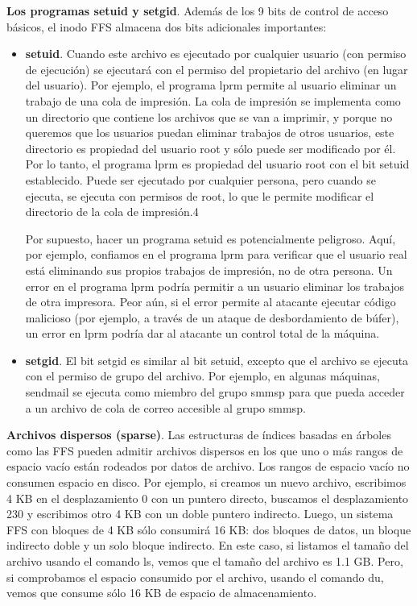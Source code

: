 \documentclass[10pt]{book}
\begin{document}
\textbf{Los programas setuid y setgid}. Además de los 9 bits de control de acceso básicos, el inodo FFS almacena dos bits adicionales importantes:
\begin{itemize}
\item \textbf{setuid}. Cuando este archivo es ejecutado por cualquier usuario (con permiso de ejecución) se ejecutará con el permiso del propietario del archivo (en lugar del usuario). Por ejemplo, el programa {\mf lprm} permite al usuario eliminar un trabajo de una cola de impresión. La cola de impresión se implementa como un directorio que contiene los archivos que se van a imprimir, y porque no queremos que los usuarios puedan eliminar trabajos de otros usuarios, este directorio es propiedad del usuario {\mf root} y sólo puede ser modificado por él. Por lo tanto, el programa {\mf lprm} es propiedad del usuario {\mf root} con el bit {\mf setuid} establecido. Puede ser ejecutado por cualquier persona, pero cuando se ejecuta, se ejecuta con permisos de {\mf root}, lo que le permite modificar el directorio de la cola de impresión.4

Por supuesto, hacer un programa {\mf setuid} es potencialmente peligroso. Aquí, por ejemplo, confiamos en el programa {\mf lprm} para verificar que el usuario real está eliminando sus propios trabajos de impresión, no de otra persona. Un error en el programa {\mf lprm} podría permitir a un usuario eliminar los trabajos de otra impresora. Peor aún, si el error permite al atacante ejecutar código malicioso (por ejemplo, a través de un ataque de desbordamiento de búfer), un error en {\mf lprm} podría dar al atacante un control total de la máquina.

\item \textbf{setgid}. El bit {\mf setgid} es similar al bit {\mf setuid}, excepto que el archivo se ejecuta con el permiso de grupo del archivo. Por ejemplo, en algunas máquinas, {\mf sendmail} se ejecuta como miembro del grupo {\mf smmsp} para que pueda acceder a un archivo de cola de correo accesible al grupo {\mf smmsp}.
\end{itemize}

\textbf{Archivos dispersos (sparse)}. Las estructuras de índices basadas en árboles como las FFS pueden admitir archivos dispersos en los que uno o más rangos de espacio vacío están rodeados por datos de archivo. Los rangos de espacio vacío no consumen espacio en disco. Por ejemplo, si creamos un nuevo archivo, escribimos 4 KB en el desplazamiento 0 con un puntero directo, buscamos el desplazamiento 230 y escribimos otro 4 KB con un doble puntero indirecto. Luego, un sistema FFS con bloques de 4 KB sólo consumirá 16 KB: dos bloques de datos, un bloque indirecto doble y un solo bloque indirecto. En este caso, si listamos el tamaño del archivo usando el comando {\mf ls}, vemos que el tamaño del archivo es 1.1 GB. Pero, si comprobamos el espacio consumido por el archivo, usando el comando {\mf du}, vemos que consume sólo 16 KB de espacio de almacenamiento.
\end{document}
